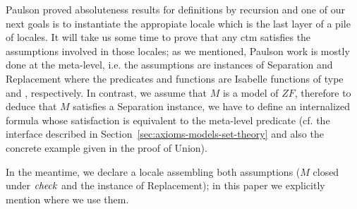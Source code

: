 Paulson proved absoluteness results for definitions by recursion and
one of our next goals is to instantiate the appropiate locale
 which is the last layer of a pile of
locales. It will take us some time to prove that any ctm satisfies the
assumptions involved in those locales; as we mentioned, Paulson work
is mostly done at the meta-level, i.e. the assumptions are instances
of Separation and Replacement where the predicates and functions are
Isabelle functions of type  and
, respectively. In contrast, we assume that
$M$ is a model of $ZF$, therefore to deduce that $M$ satisfies a
Separation instance, we have to define an internalized formula whose
satisfaction is equivalent to the meta-level predicate (cf. the
interface described in Section~\ref{sec:axioms-models-set-theory} and
also the concrete example given in the proof of Union).

In the meantime, we declare a locale
 assembling
both assumptions ($M$ closed under $\operatorname{\mathit{check}}$ and the instance of
Replacement); in this paper we explicitly mention where we use them.


